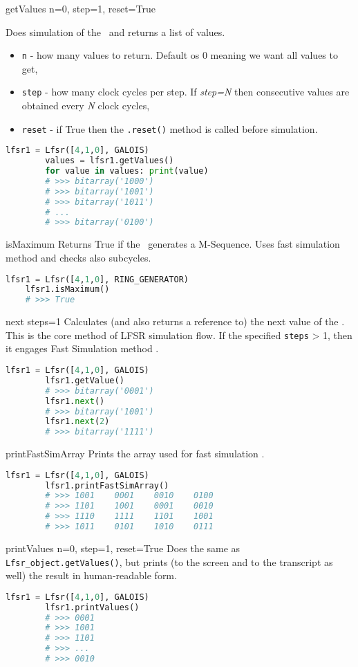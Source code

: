  {getValues} {n=0, step=1, reset=True} {
	Does simulation of the \Lfsr\ and returns a list of values.
	\begin{itemize}
		\item \texttt{n} - how many values to return. Default os 0 meaning we want all values to get,
		\item \texttt{step} - how many clock cycles per step. If \textit{step=N} then consecutive values are obtained every \textit{N} clock cycles,
		\item \texttt{reset} - if True then the \texttt{.reset()} method is called before simulation.
	\end{itemize}
}
\begin{lstlisting}[language=Python]
		lfsr1 = Lfsr([4,1,0], GALOIS)
		values = lfsr1.getValues()
		for value in values: print(value)
		# >>> bitarray('1000')
		# >>> bitarray('1001')
		# >>> bitarray('1011')
		# ...
		# >>> bitarray('0100')
\end{lstlisting}


 {isMaximum} {} {
	Returns True if the \Lfsr\ generates a M-Sequence. Uses fast simulation method \cite{lfsr:fastsim} and checks also subcycles.
}
\begin{lstlisting}[language=Python]
	lfsr1 = Lfsr([4,1,0], RING_GENERATOR)
	lfsr1.isMaximum()
	# >>> True
\end{lstlisting}

 {next} {steps=1} {
	Calculates (and also returns a reference to) the next value of the \Lfsr. This is the core method of LFSR simulation flow. If the specified \texttt{steps} > 1, then it engages Fast Simulation method \cite{lfsr:fastsim}. 
}
\begin{lstlisting}[language=Python]
		lfsr1 = Lfsr([4,1,0], GALOIS)
		lfsr1.getValue()
		# >>> bitarray('0001')
		lfsr1.next()
		# >>> bitarray('1001')
		lfsr1.next(2)
		# >>> bitarray('1111')
\end{lstlisting}

 {printFastSimArray} {} {
	Prints the array used for fast simulation \cite{lfsr:fastsim}.
}
\begin{lstlisting}[language=Python]
		lfsr1 = Lfsr([4,1,0], GALOIS)
		lfsr1.printFastSimArray()
		# >>> 1001    0001    0010    0100
		# >>> 1101    1001    0001    0010
		# >>> 1110    1111    1101    1001
		# >>> 1011    0101    1010    0111
\end{lstlisting}

 {printValues} {n=0, step=1, reset=True} {
	Does the same as \texttt{Lfsr\_object.getValues()}, but prints (to the screen and to the transcript as well) the result in human-readable form.
}
\begin{lstlisting}[language=Python]
		lfsr1 = Lfsr([4,1,0], GALOIS)
		lfsr1.printValues()
		# >>> 0001
		# >>> 1001
		# >>> 1101
		# >>> ...
		# >>> 0010
\end{lstlisting}

